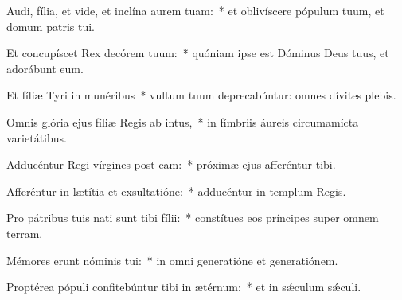 
\item Audi, fília, et vide, et inclína aurem tuam:~* et oblivíscere pópulum tuum, et domum patris tui.

\item Et concupíscet Rex decórem tuum:~* quóniam ipse est Dóminus Deus tuus, et adorábunt eum.

\item Et fíliæ Tyri in munéribus~* vultum tuum deprecabúntur: omnes dívites plebis.

\item Omnis glória ejus fíliæ Regis ab intus,~* in fímbriis áureis circumamícta varietátibus.

\item Adducéntur Regi vírgines post eam:~* próximæ ejus afferéntur tibi.

\item Afferéntur in lætítia et exsultatióne:~* adducéntur in templum Regis.

\item Pro pátribus tuis nati sunt tibi fílii:~* constítues eos príncipes super omnem terram.

\item Mémores erunt nóminis tui:~* in omni generatióne et generatiónem.

\item Proptérea pópuli confitebúntur tibi in ætérnum:~* et in sǽculum sǽculi.